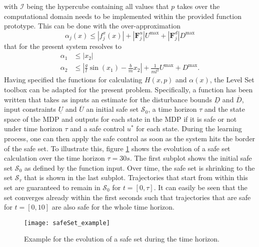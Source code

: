 \documentclass[../main.tex]{subfiles}
\begin{document}
with $\mathcal{I}$ being the hypercube containing all values that $p$ takes over the computational domain needs to be implemented within the provided function prototype. This can be done with the over-approximation
\begin{equation}
    \alpha_j(x) \leq |f_j^x(x)| + |\textbf{F}_j^u|U^{\text{max}} + |\textbf{F}_j^d|D^{\text{max}} 
\end{equation}
that for the present system resolves to 
\begin{align}
    \alpha_1 &\leq |x_2|\\
    \alpha_2 &\leq \left|\frac{g}{l}\sin(x_1)-\frac{b}{m}x_2\right| + \frac{1}{ml^2}U^{\text{max}} + D^{\text{max}}.
\end{align}
Having specified the functions for calculating $H(x,p)$ and $\alpha(x)$, the Level Set toolbox can be adapted for the present problem. Specifically, a function has been written that takes as inputs an estimate for the disturbance bounds $\underline{D}$ and $\overline{D}$, input constraints $\underline{U}$ and $\overline{U}$ an initial safe set $\mathcal{S}_0$, a time horizon $\tau$ and the state space of the MDP and outputs for each state in the MDP if it is safe or not under time horizon $\tau$ and a safe control $u^*$ for each state. During the learning process, one can then apply the safe control as soon as the system hits the border of the safe set. To illustrate this, figure \ref{fig:safeSet_example} shows the evolution of a safe set calculation over the time horizon $\tau = 30s$. The first subplot shows the initial safe set $\mathcal{S}_0$ as defined by the function input. Over time, the safe set is shrinking to the set $\mathcal{S}_\tau$ that is shown in the last subplot. Trajectories that start from within this set are guaranteed to remain in $\mathcal{S}_0$ for $t = [0, \tau]$. It can easily be seen that the set converges already within the first seconds such that trajectories that are safe for $t = [0, 10]$ are also safe for the whole time horizon. 

\begin{figure}[h]
    \centering
    \texttt{[image: safeSet\_example]}
        \caption{Example for the evolution of a safe set during the time horizon.}    
    \label{fig:safeSet_example}
\end{figure}
\end{document}
